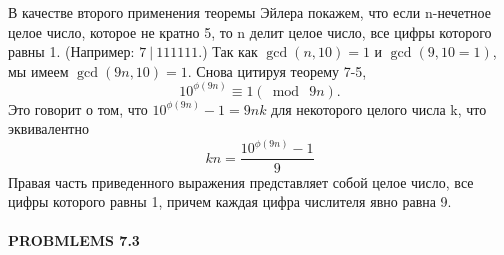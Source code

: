 \documentclass[11pt, leqno]{article}
\begin{document}
В качестве второго применения теоремы Эйлера покажем, что если n-нечетное целое число, которое не кратно 5, то n делит целое число, все цифры которого равны 1. (Например: $7\ |\ 111111$.) Так как $\gcd(n, 10) = 1$ и $\gcd(9, 10 = 1)$, мы имеем $\gcd(9n, 10) = 1$. Снова цитируя теорему 7-5,
\[10^{\phi(9n)} \equiv 1 (\bmod\ 9n).\]
Это говорит о том, что $10^{\phi(9n)} - 1 = 9nk$ для некоторого целого числа k, что эквивалентно
\[kn = \frac{10^{\phi(9n)} - 1}{9}\]
Правая часть приведенного выражения представляет собой целое число, все цифры которого равны 1, причем каждая цифра числителя явно равна 9.

\begin{center}
	\item \paragraph{PROBMLEMS 7.3}
\end{center}
\end{document}
